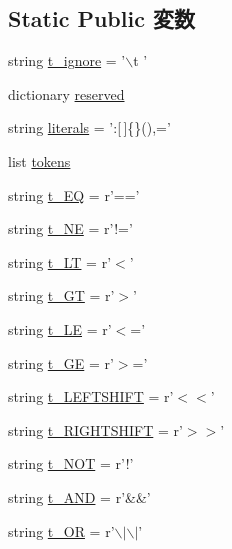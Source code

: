 \subsection*{Static Public 変数}
\begin{DoxyCompactItemize}
\item 
string \hyperlink{classslicc_1_1parser_1_1SLICC_aeeb3d1122ca6e210d2b8f9b45d5bdc54}{t\_\-ignore} = '$\backslash$t '
\item 
dictionary \hyperlink{classslicc_1_1parser_1_1SLICC_ad52c0dc2fa8283d52eb1f3352731dd11}{reserved}
\item 
string \hyperlink{classslicc_1_1parser_1_1SLICC_aa9474c45230cc66b111ef5a167f116e3}{literals} = ':\mbox{[}$\,$\mbox{]}\{\}(),='
\item 
list \hyperlink{classslicc_1_1parser_1_1SLICC_a9d8fc0a8a32a495bffe2f3e66a13ab8e}{tokens}
\item 
string \hyperlink{classslicc_1_1parser_1_1SLICC_adc3fb6f6b9fee72b65604311ee25f44f}{t\_\-EQ} = r'=='
\item 
string \hyperlink{classslicc_1_1parser_1_1SLICC_a898900290ab21931f4b67d47406aa390}{t\_\-NE} = r'!='
\item 
string \hyperlink{classslicc_1_1parser_1_1SLICC_aced84d7596eefeff759f48d880ed1b67}{t\_\-LT} = r'$<$'
\item 
string \hyperlink{classslicc_1_1parser_1_1SLICC_a4e1ff96dea0caa41346e8a7bd8e5d220}{t\_\-GT} = r'$>$'
\item 
string \hyperlink{classslicc_1_1parser_1_1SLICC_a23ff2f05e03f983e032e46997fc1957a}{t\_\-LE} = r'$<$='
\item 
string \hyperlink{classslicc_1_1parser_1_1SLICC_a7bc722c3f55809f0c881a6cea15a60d8}{t\_\-GE} = r'$>$='
\item 
string \hyperlink{classslicc_1_1parser_1_1SLICC_a98b3847129f32d045d725d178b36ff05}{t\_\-LEFTSHIFT} = r'$<$$<$'
\item 
string \hyperlink{classslicc_1_1parser_1_1SLICC_adb5229a396a0c11d83229c99acd07fc4}{t\_\-RIGHTSHIFT} = r'$>$$>$'
\item 
string \hyperlink{classslicc_1_1parser_1_1SLICC_af5ff3ead92991fc8b18616e97d45cbac}{t\_\-NOT} = r'!'
\item 
string \hyperlink{classslicc_1_1parser_1_1SLICC_a2e8f982a9dd053e933b76be1c8e307e1}{t\_\-AND} = r'\&\&'
\item 
string \hyperlink{classslicc_1_1parser_1_1SLICC_a5ae7a94eb15d2f99d4f04d076aecc02a}{t\_\-OR} = r'$\backslash$$|$$\backslash$$|$'
\item 
$$
\end{DoxyCompactItemize}
